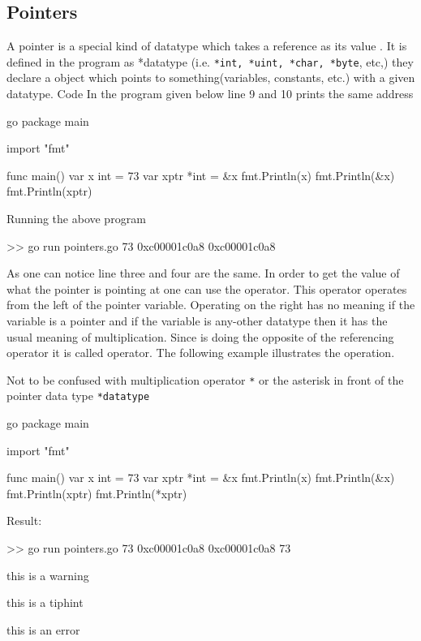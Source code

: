 \documentclass[12pt,a4paper]{report}
\begin{document}
\subsection{Pointers}
A pointer is a special kind of datatype which takes a reference as its value . It is defined in the program as *datatype (i.e. \texttt{*int, *uint, *char, *byte}, etc,) they declare a  object which points to something(variables, constants, etc.) with a given datatype. Code 
In the program given below line 9 and 10 prints the same address
%
\begin{code}{go}
package main

import "fmt"

func main() {
  var x int = 73
  var xptr *int = &x
  fmt.Println(x)
  fmt.Println(&x)
  fmt.Println(xptr)
}
\end{code}
%
Running the above program
\begin{literal}
>> go run pointers.go
73
0xc00001c0a8
0xc00001c0a8
\end{literal}
%
As one can notice line three and four are the same. In order to get the value of what the pointer is pointing at one can use the \pre{*} operator. This operator operates from the left of the pointer variable. Operating on the right has no meaning if the variable is a pointer and if the variable is any-other datatype then it has the usual meaning of multiplication. Since \pre{*} is doing the opposite of the referencing operator \pre{\&} it is called  operator. The following example illustrates the operation.
%
\begin{note}
	Not to be confused with multiplication operator \texttt{*} or the asterisk in front of the pointer data type \texttt{*datatype}
\end{note}
%
\begin{lazycode}[code title,label={myCodeLabel},nameref={code title}]{go}
package main

import "fmt"

func main() {
  var x int = 73
  var xptr *int = &x
  fmt.Println(x)
  fmt.Println(&x)
  fmt.Println(xptr)
  fmt.Println(*xptr)
}
\end{lazycode}
%
Result:
%
\begin{literal}
>> go run pointers.go
73
0xc00001c0a8
0xc00001c0a8
73
\end{literal}

\begin{warning}this is a warning\end{warning}
\begin{tip}{this is a tiphint}\end{tip}
\begin{error}this is an error\end{error}
\end{document}
